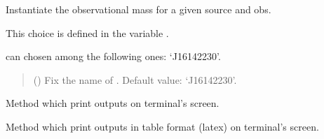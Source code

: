 \documentclass[letterpaper,10pt,english]{sphinxmanual}
\begin{document}
\begin{fulllineitems}
\label{\detokenize{source/api/setup_astro_mtov:nucleardatapy.astro.setup_mtov.setupMtov}}
\pysigstartsignatures
{}
\pysigstopsignatures
\sphinxAtStartPar
Instantiate the observational mass for a given source and obs.

\sphinxAtStartPar
This choice is defined in the variable .

\sphinxAtStartPar
{} can chosen among the following ones: ‘J1614\textendash{}2230’.
\begin{quote}\begin{description}
\sphinxAtStartPar
{} (\sphinxstyleliteralemphasis{\sphinxupquote{, }}) \textendash{} Fix the name of . Default value: ‘J1614\textendash{}2230’.

\end{description}\end{quote}

\sphinxAtStartPar
{}

\begin{fulllineitems}
\label{\detokenize{source/api/setup_astro_mtov:nucleardatapy.astro.setup_mtov.setupMtov.print_output}}
\pysigstartsignatures
{}
\pysigstopsignatures
\sphinxAtStartPar
Method which print outputs on terminal’s screen.

\end{fulllineitems}


\begin{fulllineitems}
\label{\detokenize{source/api/setup_astro_mtov:nucleardatapy.astro.setup_mtov.setupMtov.print_table}}
\pysigstartsignatures
{}
\pysigstopsignatures
\sphinxAtStartPar
Method which print outputs in table format (latex) on terminal’s screen.

\end{fulllineitems}


\end{fulllineitems}
\end{document}
